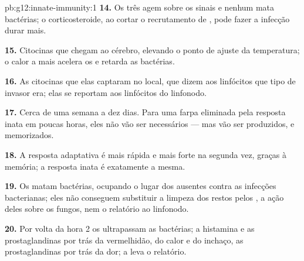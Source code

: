 \begin{solution}{pb:g12:innate-immunity:1}
\textbf{14.} Os três agem sobre os sinais e nenhum mata bactérias; o
corticosteroide, ao cortar o recrutamento de , pode fazer a
infecção durar mais.

\textbf{15.} Citocinas que chegam ao cérebro, elevando o ponto de
ajuste da temperatura; o calor a mais acelera os  e retarda as bactérias.

\textbf{16.} As citocinas que elas captaram no local, que dizem aos
linfócitos que tipo de invasor era; elas se reportam aos linfócitos do
linfonodo.

\textbf{17.} Cerca de uma semana a dez dias. Para uma farpa eliminada
pela resposta inata em poucas horas, eles não vão ser necessários ---
mas vão ser produzidos, e memorizados.

\textbf{18.} A resposta adaptativa é mais rápida e mais forte na
segunda vez, graças à memória; a resposta inata é exatamente a mesma.

\textbf{19.} Os  matam bactérias, ocupando o lugar dos
 ausentes contra as infecções bacterianas; eles não conseguem
substituir a limpeza dos restos pelos , a ação deles sobre os
fungos, nem o relatório ao linfonodo.

\textbf{20.} Por volta da hora 2 os  ultrapassam as bactérias;
a histamina e as prostaglandinas por trás da vermelhidão, do calor e do
inchaço, as prostaglandinas por trás da dor; a  leva o relatório.
\end{solution}
